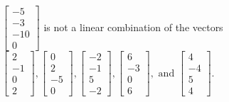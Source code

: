 \begin{exercise}
\begin{exerciseStatement}
  \end{exerciseStatement}
  \begin{exerciseAnswer}
   \(\left[\begin{array}{c}
-5 \\
-3 \\
-10 \\
0
\end{array}\right]\) 
  	 is not  
	a linear combination of the vectors \(\left[\begin{array}{c}
2 \\
-1 \\
0 \\
2
\end{array}\right] , \left[\begin{array}{c}
0 \\
2 \\
-5 \\
0
\end{array}\right] , \left[\begin{array}{c}
-2 \\
-1 \\
5 \\
-2
\end{array}\right] , \left[\begin{array}{c}
6 \\
-3 \\
0 \\
6
\end{array}\right] , \text{ and } \left[\begin{array}{c}
4 \\
-4 \\
5 \\
4
\end{array}\right]\).

	
  


  \end{exerciseAnswer}
\end{exercise}